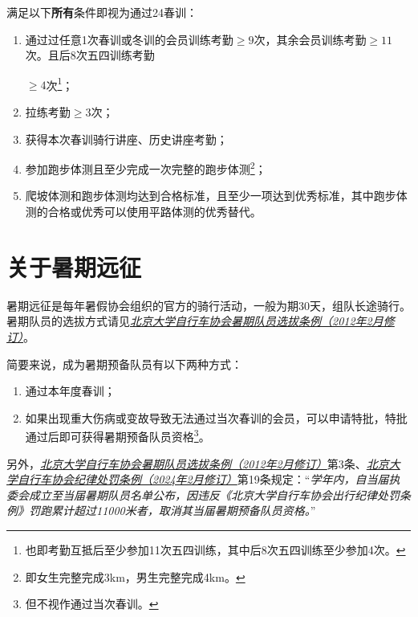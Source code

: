 \documentclass[UTF8]{ctexart}
\begin{document}
满足以下\textbf{所有}条件即视为通过24春训：
\begin{enumerate}[nosep,left=4em]
    \item 通过过任意1次春训或冬训的会员训练考勤$\ge 9$次，其余会员训练考勤$\ge 11$次。且后8次五四训练考勤
    
    $\ge 4$次\footnote{也即考勤互抵后至少参加11次五四训练，其中后8次五四训练至少参加4次。}；
    \item 拉练考勤$\ge 3$次；
    \item 获得本次春训骑行讲座、历史讲座考勤；
    \item 参加跑步体测且至少完成一次完整的跑步体测\footnote{即女生完整完成3km，男生完整完成4km。}；
    \item 爬坡体测和跑步体测均达到合格标准，且至少一项达到优秀标准，其中跑步体测的合格或优秀可以使用平路体测的优秀替代。
\end{enumerate}

\section{关于暑期远征}

暑期远征是每年暑假协会组织的官方的骑行活动，一般为期30天，组队长途骑行。暑期队员的选拔方式请见\href{https://chexie.net/bbs/content/?bid=1&tid=9610&p=1}{\textit{北京大学自行车协会暑期队员选拔条例（2012年2月修订）}}。

简要来说，成为暑期预备队员有以下两种方式：
\begin{enumerate}[nosep,left=4em]
    \item 通过本年度春训；
    \item 如果出现重大伤病或变故导致无法通过当次春训的会员，可以申请特批，特批通过后即可获得暑期预备队员资格\footnote{但不视作通过当次春训。}。
\end{enumerate}

另外，\href{https://chexie.net/bbs/content/?bid=1&tid=9610&p=1}{\textit{北京大学自行车协会暑期队员选拔条例（2012年2月修订）}}第3条、\href{https://chexie.net/bbs/content/?bid=1&tid=9751&p=1}{\textit{北京大学自行车协会纪律处罚条例（2024年2月修订）}}第19条规定：“\textit{学年内，自当届执委会成立至当届暑期队员名单公布，因违反《北京大学自行车协会出行纪律处罚条例》罚跑累计超过11000米者，取消其当届暑期预备队员资格。}”


\end{document}
